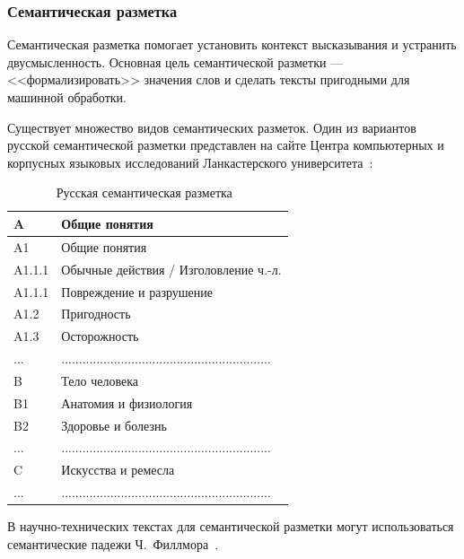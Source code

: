 \subsubsection*{Семантическая разметка}

Семантическая разметка помогает установить контекст высказывания и устранить двусмысленность. 
Основная цель семантической разметки --- <<формализировать>> значения слов и сделать тексты пригодными для машинной обработки.~\cite{butenko2022-2}

Существует множество видов семантических разметок.
Один из вариантов русской семантической разметки представлен на сайте Центра компьютерных и корпусных языковых исследований Ланкастерского университета~\cite[с. 51]{ucrel, cl2020}:

\begin{table}[H]
    \centering
    \begin{tabular}{|p{5cm}|p{11cm}|}
        \hline
        A & Общие понятия \\ \hline
        A1 & Общие понятия \\ \hline
        A1.1.1 & Обычные действия / Изголовление ч.-л. \\ \hline
        A1.1.1 & Повреждение и разрушение \\ \hline
        A1.2 & Пригодность \\ \hline
        A1.3 & Осторожность \\ \hline
        ... & ............................................................ \\ \hline
        B & Тело человека \\ \hline
        B1 & Анатомия и физиология \\ \hline
        B2 & Здоровье и болезнь \\ \hline
        ... & ............................................................ \\ \hline
        C & Искусства и ремесла \\ \hline
        ... & ............................................................ \\ \hline
    \end{tabular}
    \caption{Русская семантическая разметка~\cite{ucrel}}
    \label{tab:rsm}
\end{table}

В научно-технических текстах для семантической разметки могут использоваться семантические падежи Ч.~Филлмора~\cite{butenko2022-2}.


